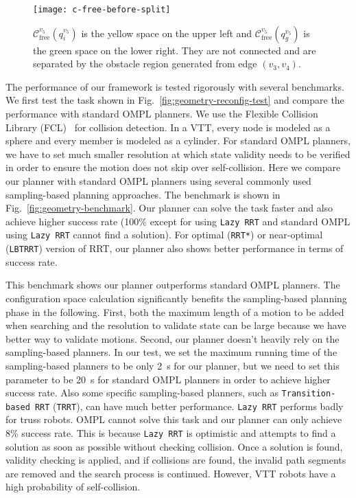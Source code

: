 \documentclass[journal]{IEEEtran}
\begin{document}
\begin{figure}[t]
  \centering
  \texttt{[image: c-free-before-split]}
  \caption{$\mathcal{C}_{\mathrm{free}}^{v_5}(q_i^{v_5})$ is the
    yellow space on the upper left and
    $\mathcal{C}_{\mathrm{free}}^{v_5}(q_g^{v_5})$ is the green space
    on the lower right. They are not connected and are separated by
    the obstacle region generated from edge $(v_3, v_4)$.}
  \label{fig:topology-free-space}
\end{figure}

The performance of our framework is tested rigorously with several
benchmarks. We first test the task shown in
Fig.~\ref{fig:geometry-reconfig-test} and compare the performance with
standard OMPL planners. We use the Flexible Collision Library
(FCL)~\cite{Jia-fcl-icra-2012} for collision detection. In a VTT,
every node is modeled as a sphere and every member is modeled as a
cylinder. For standard OMPL planners, we have to set much smaller
resolution at which state validity needs to be verified in order to
ensure the motion does not skip over self-collision. Here we compare
our planner with standard OMPL planners using several commonly used
sampling-based planning approaches. The benchmark is shown in
Fig.~\ref{fig:geometry-benchmark}. Our planner can solve the task
faster and also achieve higher success rate (100\% except for using
\texttt{Lazy RRT} and standard OMPL using \texttt{Lazy RRT} cannot
find a solution). For optimal (\texttt{RRT*}) or near-optimal
(\texttt{LBTRRT}) version of RRT, our planner also shows better
performance in terms of success rate.

This benchmark shows our planner outperforms standard OMPL
planners. The configuration space calculation significantly benefits
the sampling-based planning phase in the following. First, both the
maximum length of a motion to be added when searching and the
resolution to validate state can be large because we have better way
to validate motions. Second, our planner doesn't heavily rely on the
sampling-based planners. In our test, we set the maximum running time
of the sampling-based planners to be only \SI{2}{s} for our planner,
but we need to set this parameter to be \SI{20}{s} for standard OMPL
planners in order to achieve higher success rate. Also some specific
sampling-based planners, such as \texttt{Transition-based RRT}
(\texttt{TRRT}), can have much better performance. \texttt{Lazy RRT}
performs badly for truss robots. OMPL cannot solve this task and our
planner can only achieve 8\% success rate. This is because
\texttt{Lazy RRT} is optimistic and attempts to find a solution as
soon as possible without checking collision. Once a solution is found,
validity checking is applied, and if collisions are found, the invalid
path segments are removed and the search process is
continued. However, VTT robots have a high probability of
self-collision.
\end{document}
